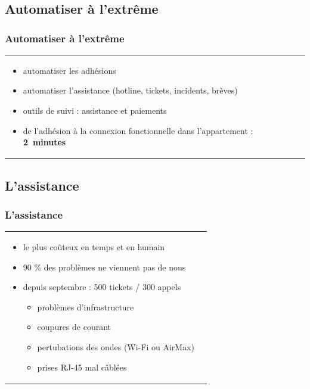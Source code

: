 \documentclass[handout]{beamer}
\begin{document}
	\subsection{Automatiser à l'extrême}
		\begin{frame}
		\frametitle{Automatiser à l'extrême}
		\begin{tabular}{l l}
			\begin{minipage}{0.2\textwidth}
				\begin{center}
				\end{center}
			\end{minipage}

			\begin{minipage}{0.8\textwidth}
				\begin{itemize}
					\item automatiser les adhésions
					\item automatiser l'assistance (hotline, tickets, incidents, brèves)
					\item outils de suivi : assistance et paiements
					\item de l'adhésion à la connexion fonctionnelle dans l'appartement : \mbox{\textbf{2 minutes}}
				\end{itemize}
			\end{minipage}
			
		\end{tabular}
		\end{frame}

	\subsection{L'assistance}
		\begin{frame}
		\frametitle{L'assistance}
		\begin{tabular}{l l}
			\begin{minipage}{0.2\textwidth}
				\begin{center}
				\end{center}
			\end{minipage}

			\begin{minipage}{0.8\textwidth}
				\begin{itemize}
					\item le plus coûteux en temps et en humain
					\item 90 \% des problèmes ne viennent pas de nous
					\item depuis septembre : 500 tickets / 300 appels
					\begin{itemize}
						\item problèmes d'infrastructure
						\item coupures de courant
						\item pertubations des ondes (Wi-Fi ou AirMax)
						\item prises RJ-45 mal câblées
					\end{itemize}
				\end{itemize}
			\end{minipage}
			
		\end{tabular}
		\end{frame}
\end{document}
